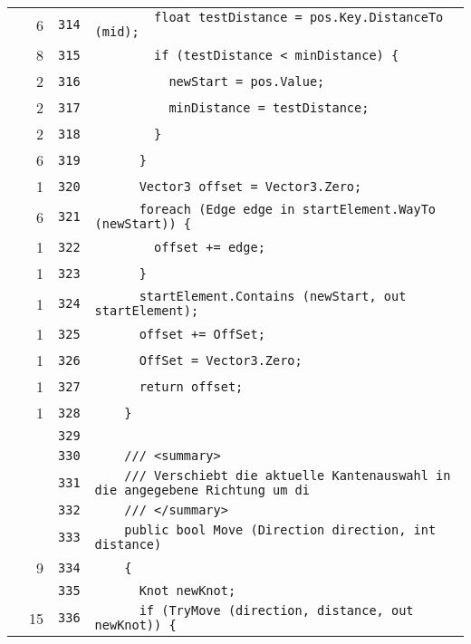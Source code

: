 \documentclass[a4paper,10pt]{article}
\begin{document}
\begin{longtable}[l]{lrrl}
\cellcolor{green} & 6 & \verb~314~ & \verb~        float testDistance = pos.Key.DistanceTo (mid);~\\
\cellcolor{green} & 8 & \verb~315~ & \verb~        if (testDistance < minDistance) {~\\
\cellcolor{green} & 2 & \verb~316~ & \verb~          newStart = pos.Value;~\\
\cellcolor{green} & 2 & \verb~317~ & \verb~          minDistance = testDistance;~\\
\cellcolor{green} & 2 & \verb~318~ & \verb~        }~\\
\cellcolor{green} & 6 & \verb~319~ & \verb~      }~\\
\cellcolor{green} & 1 & \verb~320~ & \verb~      Vector3 offset = Vector3.Zero;~\\
\cellcolor{green} & 6 & \verb~321~ & \verb~      foreach (Edge edge in startElement.WayTo (newStart)) {~\\
\cellcolor{green} & 1 & \verb~322~ & \verb~        offset += edge;~\\
\cellcolor{green} & 1 & \verb~323~ & \verb~      }~\\
\cellcolor{green} & 1 & \verb~324~ & \verb~      startElement.Contains (newStart, out startElement);~\\
\cellcolor{green} & 1 & \verb~325~ & \verb~      offset += OffSet;~\\
\cellcolor{green} & 1 & \verb~326~ & \verb~      OffSet = Vector3.Zero;~\\
\cellcolor{green} & 1 & \verb~327~ & \verb~      return offset;~\\
\cellcolor{green} & 1 & \verb~328~ & \verb~    }~\\
\cellcolor{gray} &  & \verb~329~ & \verb~~\\
\cellcolor{gray} &  & \verb~330~ & \verb~    /// <summary>~\\
\cellcolor{gray} &  & \verb~331~ & \verb~    /// Verschiebt die aktuelle Kantenauswahl in die angegebene Richtung um di~\\
\cellcolor{gray} &  & \verb~332~ & \verb~    /// </summary>~\\
\cellcolor{gray} &  & \verb~333~ & \verb~    public bool Move (Direction direction, int distance)~\\
\cellcolor{green} & 9 & \verb~334~ & \verb~    {~\\
\cellcolor{gray} &  & \verb~335~ & \verb~      Knot newKnot;~\\
\cellcolor{green} & 15 & \verb~336~ & \verb~      if (TryMove (direction, distance, out newKnot)) {~\\

\end{longtable}
\end{document}
